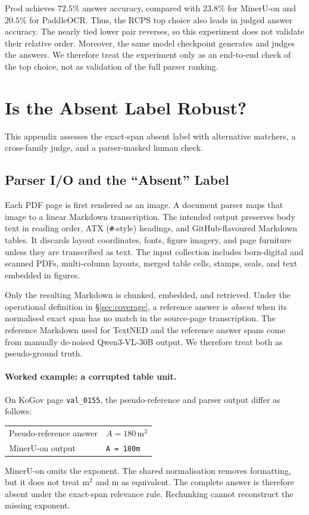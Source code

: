 \documentclass[11pt]{article}
\newcommand{\rcps}{\textnormal{\textsc{RCPS}}}
\begin{document}
Prod achieves $72.5\%$ answer accuracy, compared with $23.8\%$ for MinerU-on and $20.5\%$ for PaddleOCR. Thus, the \rcps{} top choice also leads in judged answer accuracy. The nearly tied lower pair reverses, so this experiment does not validate their relative order. Moreover, the same model checkpoint generates and judges the answers. We therefore treat the experiment only as an end-to-end check of the top choice, not as validation of the full parser ranking.

\section{Is the Absent Label Robust?}
\label{app:familyneutral}

This appendix assesses the exact-span absent label with alternative matchers, a cross-family judge, and a parser-masked human check.

\subsection{Parser I/O and the ``Absent'' Label}
\label{sec:parser-def}
Each PDF page is first rendered as an image. A document parser maps that image to a linear Markdown transcription. The intended output preserves body text in reading order, ATX (\texttt{\#}-style) headings, and GitHub-flavoured Markdown tables. It discards layout coordinates, fonts, figure imagery, and page furniture unless they are transcribed as text. The input collection includes born-digital and scanned PDFs, multi-column layouts, merged table cells, stamps, seals, and text embedded in figures.

Only the resulting Markdown is chunked, embedded, and retrieved. Under the operational definition in \S\ref{sec:coverage}, a reference answer is \emph{absent} when its normalised exact span has no match in the source-page transcription. The reference Markdown used for TextNED and the reference answer spans come from manually de-noised Qwen3-VL-30B output. We therefore treat both as pseudo-ground truth.

\paragraph{Worked example: a corrupted table unit.} On KoGov page \texttt{val\_0155}, the pseudo-reference and parser output differ as follows:
\begin{center}
\small
\begin{tabular}{ll}
\toprule
Pseudo-reference answer & $A=180\,\mathrm{m}^{2}$ \\
MinerU-on output & \texttt{A = 180m} \\
\bottomrule
\end{tabular}
\end{center}
MinerU-on omits the exponent. The shared normalisation removes formatting, but it does not treat $\mathrm{m}^{2}$ and $\mathrm{m}$ as equivalent. The complete answer is therefore absent under the exact-span relevance rule. Rechunking cannot reconstruct the missing exponent.
\end{document}

